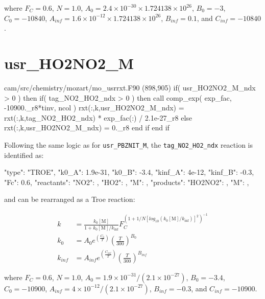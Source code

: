 \documentclass[titlepage]{article}
\begin{document}
\noindent where $F_C = 0.6$, $N = 1.0$, $A_0 = 2.4 \times 10^{-30} \times 1.724138 \times 10^{26}$, $B_0 = -3$, $C_0 = -10840$, $A_{inf} = 1.6 \times 10^{-12} \times 1.724138 \times 10^{26}$, $B_{inf} = 0.1$, and $C_{inf} = -10840$.


\section{usr\_HO2NO2\_M}

\begin{blockcode}[commandchars=\\\{\}]
\color{gray}cam/src/chemistry/mozart/mo_usrrxt.F90 (898,905)
       if( usr_HO2NO2_M_ndx > 0 ) then
          if( tag_NO2_HO2_ndx > 0 ) then
             call comp_exp( exp_fac, -10900._r8*tinv, ncol )
             rxt(:,k,usr_HO2NO2_M_ndx) = rxt(:,k,tag_NO2_HO2_ndx) * exp_fac(:) / 2.1e-27_r8
          else
             rxt(:,k,usr_HO2NO2_M_ndx) = 0._r8
          end if
       end if
\end{blockcode}

Following the same logic as for \verb>usr_PBZNIT_M>, the \verb>tag_NO2_HO2_ndx> reaction is identified as:

\begin{blockcode}
        {
          "type": "TROE",
          "k0_A": 1.9e-31,
          "k0_B": -3.4,
          "kinf_A": 4e-12,
          "kinf_B": -0.3,
          "Fc": 0.6,
          "reactants": {
            "NO2": { },
            "HO2": { },
            "M": { }
          },
          "products": {
            "HO2NO2": { },
            "M": { }
          }
        },
\end{blockcode}

\noindent and can be rearranged as a Troe reaction:

\begin{equation}
\begin{split}
k & = \frac{k_0[\mbox{M}]}{1+k_0[\mbox{M}]/k_{\inf}}F_C^{(1+1/N[log_{10}(k_0[\mbox{M}]/k_{\inf})]^2)^{-1}} \\
k_0 & = A_0 e^{\left( \frac{C_0}{T} \right)} \left( \frac{T}{300} \right)^{B_0} \\
k_{inf} & = A_{inf} e^{\left( \frac{C_{inf}}{T} \right)} \left( \frac{T}{300} \right)^{B_{inf}}
\end{split}
\end{equation}

\noindent where $F_C = 0.6$, $N = 1.0$, $A_0 = 1.9 \times 10^{-31} / \left( 2.1 \times 10^{-27} \right)$, $B_0 = -3.4$, $C_0 = -10900$, $A_{inf} = 4 \times 10^{-12} / \left( 2.1 \times 10^{-27} \right)$, $B_{inf} = -0.3$, and $C_{inf} = -10900$.
\end{document}
